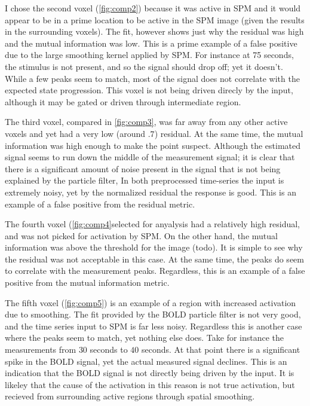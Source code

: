 I chose the second voxel (\autoref{fig:comp2}) because it was active in SPM and it would appear to be in a prime
location to be active in the SPM image (given the results in the surrounding voxels). The fit,
however shows just why the residual was high and the mutual information was low. This is a
prime example of a false positive due to the large smoothing kernel applied by SPM. 
For instance at 75 seconds, the stimulus is not present, and so the signal should drop off; yet
it doesn't. While a few peaks seem to match, most of the signal does not correlate with the
expected state progression. This voxel is not being driven direcly by the input, although it
may be gated or driven through intermediate region. 

The third voxel, compared in \autoref{fig:comp3}, was far away from any other active voxels 
and yet had a very low (around $.7$) residual. At the same time, the mutual information was
high enough to make the point suspect. Although the estimated signal seems to run down the
middle of the measurement signal; it is clear that there is a significant amount of noise
present in the signal that is not being explained by the particle filter, 
In both preprocessed time-series the input is extremely noisy, yet by the normalized residual 
the response is good. This is an example of a false positive from the residual metric. 

The fourth voxel (\autoref{fig:comp4}selected for anyalysis had a relatively high residual, and was not picked
for activation by SPM. On the other hand, the mutual information was above the threshold
for the image (todo). It is simple to see why the residual was not acceptable in this case.
At the same time, the peaks do seem to correlate with the measurement peaks. Regardless,
this is an example of a  false positive from the mutual information metric. 

The fifth voxel (\autoref{fig:comp5}) is an example of a region with increased activation
due to smoothing. The fit provided by the BOLD particle filter is not very good, and the time
series input to SPM is far less noisy. Regardless this is another case where the peaks
seem to match, yet nothing else does. Take for instance the measurements from $30$ seconds
to $40$ seconds. At that point there is a significant spike in the BOLD signal, yet the
actual measured signal declines. This is an indication that the BOLD signal is not directly
being driven by the input. It is likeley that the cause of the activation in this reason is
not true activation, but recieved from surrounding active regions through spatial smoothing. 

